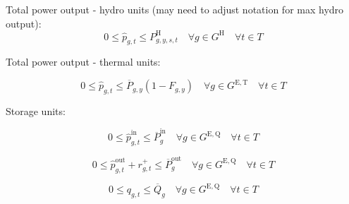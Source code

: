 \documentclass{article}
\newcommand{\sGeneratorsExistingThermal}{G^{\mathrm{E,T}}}
\newcommand{\sGeneratorsCandidateThermal}{G^{\mathrm{C,T}}}
\newcommand{\sGeneratorsHydro}{G^{\mathrm{H}}}
\newcommand{\sStorageExisting}{G^{\mathrm{E,Q}}}
\newcommand{\sStorageCandidate}{G^{\mathrm{C,Q}}}
\newcommand{\sIntervals}{T}
\newcommand{\iGenerator}{g}
\newcommand{\iYear}{y}
\newcommand{\iScenario}{s}
\newcommand{\iInterval}{t}
\newcommand{\cPowerOutputMax}[1][\iGenerator,\iYear]{\overline{P}_{#1}}
\newcommand{\cPowerChargingMax}[1][\iGenerator]{\overline{P}^{\mathrm{in}}_{#1}}
\newcommand{\cPowerDischargingMax}[1][\iGenerator]{\overline{P}^{\mathrm{out}}_{#1}}
\newcommand{\cStorageUnitEnergyMax}[1][\iGenerator]{\overline{Q}_{#1}}
\newcommand{\cRetirementIndicator}[1][\iGenerator,\iYear]{F_{#1}}
\newcommand{\cPowerOutputHydro}[1][\iGenerator,\iYear,\iScenario,\iInterval]{P^{\mathrm{H}}_{#1}}
\newcommand{\vReserveUp}[1][\iGenerator,\iInterval]{r^{+}_{#1}}
\newcommand{\vPowerTotal}[1][\iGenerator,\iInterval]{\hat{p}_{#1}}
\newcommand{\vPowerTotalIn}[1][\iGenerator,\iInterval]{\hat{p}^{\mathrm{in}}_{#1}}
\newcommand{\vPowerTotalOut}[1][\iGenerator,\iInterval]{\hat{p}^{\mathrm{out}}_{#1}}
\newcommand{\vStorageUnitEnergy}[1][\iGenerator,\iInterval]{q_{#1}}
\newcommand{\vInstalledCapacityTotalScenario}[1][\iGenerator,\iYear,\iScenario]{b_{#1}}
\begin{document}
Total power output - hydro units (may need to adjust notation for max hydro output):
\begin{equation}
0 \leq \vPowerTotal \leq \cPowerOutputHydro \quad \forall \iGenerator \in \sGeneratorsHydro  \quad \forall \iInterval \in \sIntervals 
\end{equation}

Total power output - thermal units:

\begin{equation}
0 \leq \vPowerTotal \leq \cPowerOutputMax \left(1 - \cRetirementIndicator \right) \quad \forall \iGenerator \in \sGeneratorsExistingThermal  \quad \forall \iInterval \in \sIntervals
\end{equation}


Storage units:

\begin{equation}
0 \leq \vPowerTotalIn \leq \cPowerChargingMax \quad \forall \iGenerator \in \sStorageExisting  \quad \forall \iInterval \in \sIntervals
\end{equation}


\begin{equation}
0 \leq \vPowerTotalOut + \vReserveUp \leq \cPowerDischargingMax \quad \forall \iGenerator \in \sStorageExisting  \quad \forall \iInterval \in \sIntervals
\end{equation}


\begin{equation}
0 \leq \vStorageUnitEnergy \leq \cStorageUnitEnergyMax \quad \forall \iGenerator \in \sStorageExisting  \quad \forall \iInterval \in \sIntervals
\end{equation}
\end{document}
